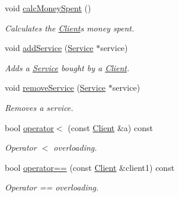 \begin{DoxyCompactItemize}
void \hyperlink{class_client_a65027bc2da365dfdbbf0393ee2697586}{calc\+Money\+Spent} ()
\begin{DoxyCompactList}\small\item\em Calculates the \hyperlink{class_client}{Client}\textquotesingle{}s money spent. \end{DoxyCompactList}\item 
void \hyperlink{class_client_abf36aa7168464608e917fa40f1ba52db}{add\+Service} (\hyperlink{class_service}{Service} $\ast$service)
\begin{DoxyCompactList}\small\item\em Adds a \hyperlink{class_service}{Service} bought by a \hyperlink{class_client}{Client}. \end{DoxyCompactList}\item 
void \hyperlink{class_client_a018c06770de617bb404151e499206355}{remove\+Service} (\hyperlink{class_service}{Service} $\ast$service)
\begin{DoxyCompactList}\small\item\em Removes a service. \end{DoxyCompactList}\item 
bool \hyperlink{class_client_a1cbbbf2ea0d65791314b7640c053197b}{operator$<$} (const \hyperlink{class_client}{Client} \&a) const
\begin{DoxyCompactList}\small\item\em Operator $<$ overloading. \end{DoxyCompactList}\item 
bool \hyperlink{class_client_a5cc669077f776648216ae03461b8c178}{operator==} (const \hyperlink{class_client}{Client} \&client1) const
\begin{DoxyCompactList}\small\item\em Operator == overloading. \end{DoxyCompactList}\end{DoxyCompactItemize}
